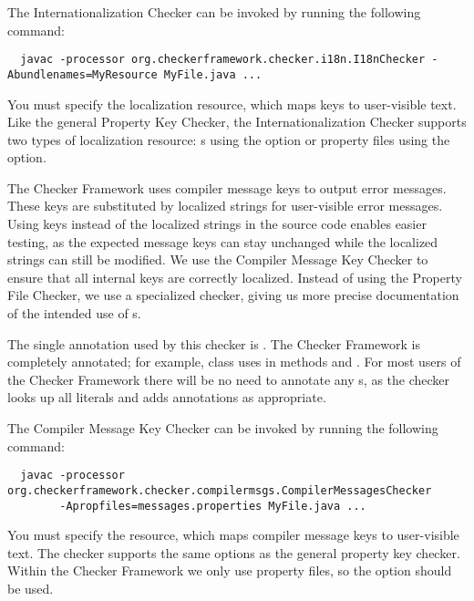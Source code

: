 The Internationalization Checker can be invoked by running the following
command:

\begin{smaller}
\begin{Verbatim}
  javac -processor org.checkerframework.checker.i18n.I18nChecker -Abundlenames=MyResource MyFile.java ...
\end{Verbatim}
\end{smaller}

You must specify the localization resource, which maps keys to user-visible
text.  Like the general Property Key Checker, the Internationalization Checker
supports two types of localization resource:
s using the
 option
or property files using the
 option.




The Checker Framework uses compiler message keys to output error messages.
These keys are substituted by localized strings for user-visible error messages.
Using keys instead of the localized strings in the source code enables easier
testing, as the expected message keys can stay unchanged while the localized
strings can still be modified.
We use the Compiler Message Key Checker to ensure that all internal
keys are correctly localized.
Instead of using the Property File Checker, we use a specialized checker,
giving us more precise documentation of the intended use of s.

The single annotation used by this checker is
.
The Checker Framework is completely annotated;
for example, class 
uses  in methods  and .
For most users of the Checker Framework there will be no need to annotate any
s, as the checker looks up all  literals and adds
annotations as appropriate.

The Compiler Message Key Checker can be invoked by running the following
command:

\begin{Verbatim}
  javac -processor org.checkerframework.checker.compilermsgs.CompilerMessagesChecker
        -Apropfiles=messages.properties MyFile.java ...
\end{Verbatim}

You must specify the resource, which maps compiler message keys to user-visible
text.  The checker supports the same options as the general property key checker.
Within the Checker Framework we only use property files,
so the  option should be used.

